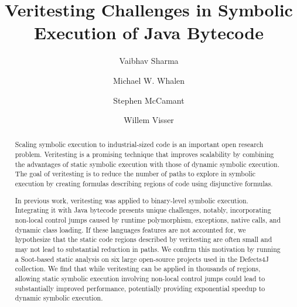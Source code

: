 \documentclass[sigconf]{acmart}
\begin{document}
\title{Veritesting Challenges in Symbolic Execution of Java Bytecode}
\author{Vaibhav Sharma}

\author{Michael W. Whalen}

\author{Stephen McCamant}

\author{Willem Visser}
\renewcommand{\shortauthors}{V. Sharma et al.}


\begin{abstract}
Scaling symbolic execution to industrial-sized code is an important open research problem.
%
Veritesting is a promising technique that improves scalability by combining the advantages of static symbolic execution with those of dynamic symbolic execution.  The goal of veritesting is to reduce the number of paths to explore in symbolic execution by creating formulas describing regions of code using disjunctive formulas.

In previous work, veritesting was applied to binary-level symbolic execution.
%
Integrating it with Java bytecode presents unique challenges, 
%
notably, incorporating non-local control jumps caused by runtime polymorphism, exceptions, native calls, and dynamic class loading.
%
If these languages features are not accounted for, we hypothesize that the static code regions described by veritesting are often small and may not lead to substantial reduction in paths.  We confirm this motivation by running a Soot-based static analysis on six large open-source projects used in the Defects4J collection.
%
We find that while veritesting can be applied in thousands of regions, allowing static symbolic execution involving non-local control jumps could lead to substantially improved performance, potentially providing exponential speedup to dynamic symbolic execution.
%
\end{abstract}
\end{document}
